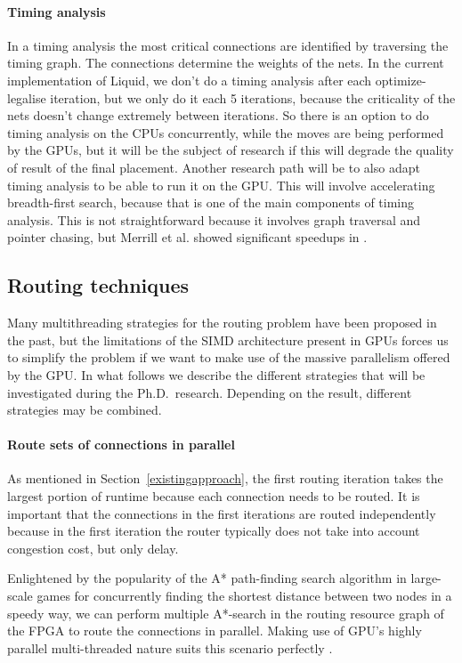 \documentclass[a4paper,oneside,12pt]{article}
\begin{document}
\paragraph{Timing analysis}
In a timing analysis the most critical connections are identified by traversing the timing graph. The connections determine the weights of the nets.
In the current implementation of {\sc Liquid}, we don't do a timing analysis after each optimize-legalise iteration, but we only do it each 5 iterations, because the criticality of the nets doesn't change extremely between iterations.
So there is an option to do timing analysis on the CPUs concurrently, while the moves are being performed by the GPUs, but it will be the subject of research if this will degrade the quality of result of the final placement.
Another research path will be to also adapt timing analysis to be able to run it on the GPU. This will involve accelerating breadth-first search, because that is one of the main components of timing analysis. This is not straightforward because it involves graph traversal and pointer chasing, but Merrill et al. showed significant speedups in \cite{Merrill2015}.



\subsection{Routing techniques}\label{routetech}

Many multithreading strategies for the routing problem have been proposed in the past, but the limitations of the SIMD architecture present in GPUs forces us to simplify the problem if we want to make use of the massive parallelism offered by the GPU.
In what follows we describe the different strategies that will be investigated during the Ph.D.\ research. Depending on the result, different strategies may be combined.

\paragraph{Route sets of connections in parallel}
As mentioned in Section~\ref{existingapproach}, the first routing iteration takes the largest portion of runtime because each connection needs to be routed.
It is important that the connections in the first iterations are routed independently because in the first iteration the router typically does not take into account congestion cost, but only delay.

Enlightened by the popularity of the A* path-finding search algorithm in large-scale games for concurrently finding the shortest distance between two nodes in a speedy way, we can perform multiple A*-search in the routing resource graph of the FPGA to route the connections in parallel. Making use of GPU's highly parallel multi-threaded nature suits this scenario perfectly \cite{bleiweiss2008gpu,bleiweiss2012system}.
\end{document}
